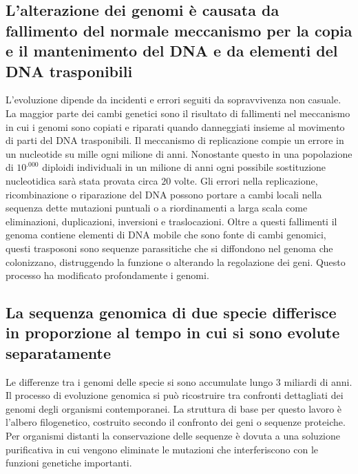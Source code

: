 \subsection{L'alterazione dei genomi \`e causata da fallimento del normale meccanismo per la copia e il mantenimento del DNA e da elementi del DNA trasponibili}
L'evoluzione dipende da incidenti e errori seguiti da sopravvivenza non casuale. La maggior parte dei cambi genetici sono il risultato di fallimenti nel meccanismo in cui i genomi
sono copiati e riparati quando danneggiati insieme al movimento di parti del DNA trasponibili. Il meccanismo di replicazione compie un errore in un nucleotide su mille ogni milione di
anni. Nonostante questo in una popolazione di $10^.000$ diploidi individuali in un milione di anni ogni possibile sostituzione nucleotidica sar\`a stata provata circa $20$ volte. Gli
errori nella replicazione, ricombinazione o riparazione del DNA possono portare a cambi locali nella sequenza dette mutazioni puntuali o a riordinamenti a larga scala come eliminazioni, 
duplicazioni, inversioni e traslocazioni. Oltre a questi fallimenti il genoma contiene elementi di DNA mobile che sono fonte di cambi genomici, questi trasposoni sono sequenze 
parassitiche che si diffondono nel genoma che colonizzano, distruggendo la funzione o alterando la regolazione dei geni. Questo processo ha modificato profondamente i genomi.
\subsection{La sequenza genomica di due specie differisce in proporzione al tempo in cui si sono evolute separatamente}
Le differenze tra i genomi delle specie si sono accumulate lungo $3$ miliardi di anni. Il processo di evoluzione genomica si pu\`o ricostruire tra confronti dettagliati dei genomi degli
organismi contemporanei. La struttura di base per questo lavoro \`e l'albero filogenetico, costruito secondo il confronto dei geni o sequenze proteiche. Per organismi distanti la 
conservazione delle sequenze \`e dovuta a una soluzione purificativa in cui vengono eliminate le mutazioni che interferiscono con le funzioni genetiche importanti. 
